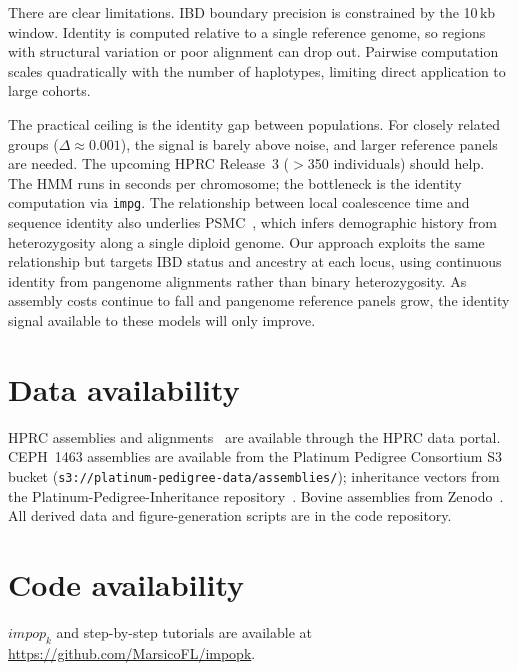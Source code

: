 \documentclass[10pt,twocolumn]{article}
\begin{document}
There are clear limitations. IBD boundary precision is constrained by the 10\,kb window. Identity is computed relative to a single reference genome, so regions with structural variation or poor alignment can drop out. Pairwise computation scales quadratically with the number of haplotypes, limiting direct application to large cohorts.

The practical ceiling is the identity gap between populations. For closely related groups ($\Delta \approx 0.001$), the signal is barely above noise, and larger reference panels are needed. The upcoming HPRC Release~3 ($>$350 individuals) should help. The HMM runs in seconds per chromosome; the bottleneck is the identity computation via \texttt{impg}. The relationship between local coalescence time and sequence identity also underlies PSMC~\cite{li2011psmc}, which infers demographic history from heterozygosity along a single diploid genome. Our approach exploits the same relationship but targets IBD status and ancestry at each locus, using continuous identity from pangenome alignments rather than binary heterozygosity. As assembly costs continue to fall and pangenome reference panels grow, the identity signal available to these models will only improve.




\section*{Data availability}
HPRC assemblies and alignments~\cite{liao2023hprc} are available through the HPRC data portal. CEPH~1463 assemblies are available from the Platinum Pedigree Consortium S3 bucket (\texttt{s3://platinum-pedigree-data/assemblies/}); inheritance vectors from the Platinum-Pedigree-Inheritance repository~\cite{platinum_ped}. Bovine assemblies from Zenodo~\cite{bovine_superpangenome_data}. All derived data and figure-generation scripts are in the code repository.

\section*{Code availability}
\texttt{$impop_k$} and step-by-step tutorials are available at \url{https://github.com/MarsicoFL/impopk}.
\end{document}
